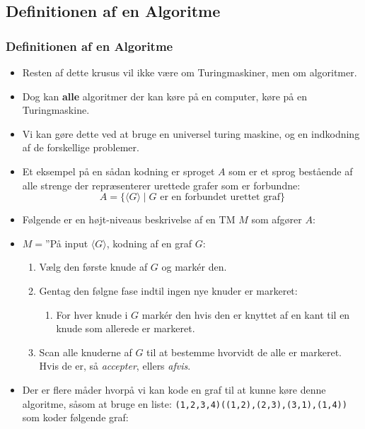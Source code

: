 \subsection{Definitionen af en Algoritme}%
\label{subsec:label}

\begin{frame}[allowframebreaks]
  \frametitle{Definitionen af en Algoritme}
  \begin{itemize}
    \item Resten af dette krusus vil ikke være om Turingmaskiner, men om algoritmer.
    \item Dog kan \textbf{alle} algoritmer der kan køre på en computer, køre på en Turingmaskine.
    \item Vi kan gøre dette ved at bruge en universel turing maskine, og en indkodning af de forskellige problemer.
    \item Et eksempel på en sådan kodning er sproget $A$ som er et sprog bestående af alle strenge der repræsenterer urettede grafer som er forbundne:
          \begin{equation*}
A = \{\langle G\rangle \mid G \text{ er en forbundet urettet graf}\}
          \end{equation*}

    \item Følgende er en højt-niveaus beskrivelse af en TM $M$ som afgører $A$:
    \item $M = $''På  input $\langle G \rangle$, kodning af en graf $G$:
          \begin{enumerate}
            \item Vælg den første knude af $G$ og markér den.
            \item Gentag den følgne fase indtil ingen nye knuder er markeret:
                  \begin{enumerate}
                    \item For hver knude i $G$ markér den hvis den er knyttet af en kant til en knude som allerede er markeret.
                  \end{enumerate}

            \item Scan alle knuderne af $G$ til at bestemme hvorvidt de alle er markeret. Hvis de er, så \textit{accepter}, ellers \textit{afvis}.
          \end{enumerate}

    \item Der er flere måder hvorpå vi kan kode en graf til at kunne køre denne algoritme, såsom at bruge en liste: \texttt{(1,2,3,4)((1,2),(2,3),(3,1),(1,4))} som koder følgende graf:


\end{itemize}
\end{frame}
